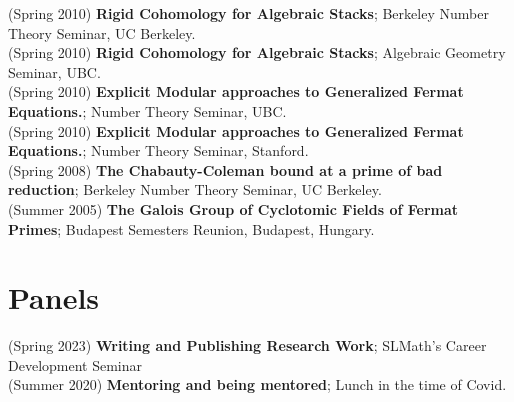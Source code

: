 \documentclass[margin,line]{res}
\begin{document}
\begin{resume}
(Spring 2010) \textbf{Rigid Cohomology for Algebraic Stacks};
 Berkeley Number Theory Seminar, UC Berkeley.
\vspace{.05cm}\\
(Spring 2010) \textbf{Rigid Cohomology for Algebraic Stacks};
Algebraic Geometry Seminar, UBC.
\vspace{.05cm}\\
(Spring 2010) \textbf{Explicit Modular approaches to Generalized Fermat Equations.};
 Number Theory Seminar, UBC.
\vspace{.05cm}\\
(Spring 2010) \textbf{Explicit Modular approaches to Generalized Fermat Equations.};
 Number Theory Seminar, Stanford.
\vspace{.05cm}\\
(Spring 2008) \textbf{The Chabauty-Coleman bound at a prime of bad reduction};
 Berkeley Number Theory Seminar, UC Berkeley.
\vspace{.05cm}\\
(Summer 2005) \textbf{The Galois Group of Cyclotomic Fields of Fermat Primes};
Budapest Semesters Reunion, Budapest, Hungary. 
\vspace{.05cm}\\
  
  
\section{\sc Panels}
(Spring 2023) \textbf{ Writing and Publishing Research Work};
SLMath's Career Development Seminar
\vspace{.05cm}\\  
(Summer 2020) \textbf{Mentoring and being mentored};
Lunch in the time of Covid. 
\vspace{.05cm}\\


\end{resume}
\end{document}
